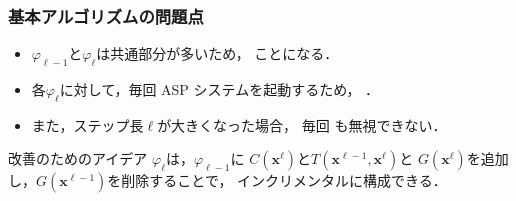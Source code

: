 \documentclass[dvipdfmx,11pt]{beamer}
\begin{document}
\begin{frame}\frametitle{基本アルゴリズムの問題点}

  
  \begin{itemize}
  \item $\varphi_{\ell-1}$と$\varphi_{\ell}$は共通部分が多いため，
    ことになる．
  \item 各$\varphi_\ell$に対して，毎回 ASP システムを起動するため，
    ．
  \item また，ステップ長$\ell$が大きくなった場合，
    毎回 も無視できない．
  \end{itemize}

  \begin{alertblock}{改善のためのアイデア}\centering
    $\varphi_{\ell}$は，$\varphi_{\ell-1}$に
    $C(\bm{x}^{\ell})$と$T(\bm{x}^{\ell-1},\bm{x}^{\ell})$と
    $G(\bm{x}^{\ell})$を追加し，$G(\bm{x}^{\ell-1})$を削除することで，
    インクリメンタルに構成できる．    
  \end{alertblock}
\end{frame}
\end{document}
